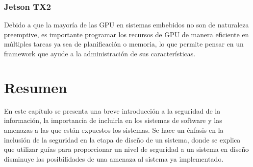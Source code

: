 \subsubsection{Jetson TX2}

Debido a que la mayoría de las GPU en sistemas embebidos no son de naturaleza preemptive, es importante programar los recursos de GPU de manera eficiente en múltiples tareas \cite{TX2Intro} ya sea de planificación o memoria, lo que permite pensar en un framework que ayude a la administración de sus características. 

\section{Resumen}

En este capítulo se presenta una breve introducción a la seguridad de la información, la importancia de incluirla en los sistemas de software y las amenazas a las que están expuestos los sistemas. Se hace un énfasis en la inclusión de la seguridad en la etapa de diseño de un sistema, donde se explica que utilizar guías para proporcionar un nivel de seguridad a un sistema en diseño disminuye las posibilidades de una amenaza al sistema ya implementado. 


